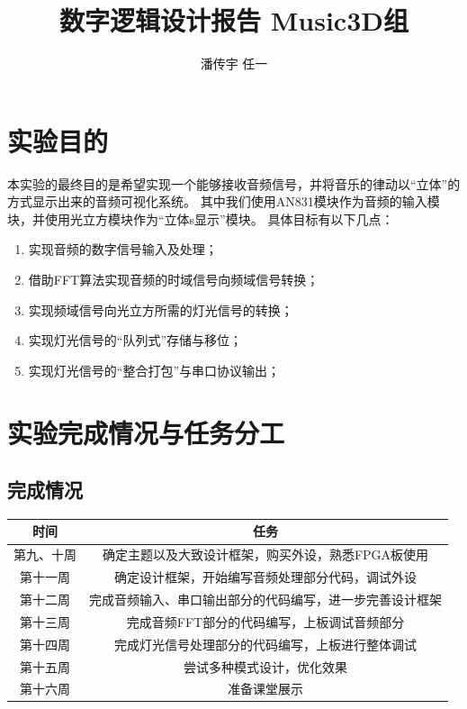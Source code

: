 \documentclass[12pt]{article}
\begin{document}
\title{数字逻辑设计报告 \quad Music3D组}
\author{潘传宇 \quad 任一}
\maketitle

\newpage
\tableofcontents

\newpage
\section{实验目的}
本实验的最终目的是希望实现一个能够接收音频信号，并将音乐的律动以“立体”的方式显示出来的音频可视化系统。
其中我们使用AN831模块作为音频的输入模块，并使用光立方模块作为“立体s显示”模块。
具体目标有以下几点：
\begin{enumerate}
    \item 实现音频的数字信号输入及处理；
    \item 借助FFT算法实现音频的时域信号向频域信号转换；
    \item 实现频域信号向光立方所需的灯光信号的转换；
    \item 实现灯光信号的“队列式”存储与移位；
    \item 实现灯光信号的“整合打包”与串口协议输出；
\end{enumerate}

\section{实验完成情况与任务分工}
\subsection{完成情况}
\begin{center}
    \begin{tabular}{|c|c|}
        \hline
        时间& 任务\\
        \hline
        第九、十周& 确定主题以及大致设计框架，购买外设，熟悉FPGA板使用\\
        \hline
        第十一周& 确定设计框架，开始编写音频处理部分代码，调试外设\\
        \hline
        第十二周& 完成音频输入、串口输出部分的代码编写，进一步完善设计框架\\
        \hline
        第十三周& 完成音频FFT部分的代码编写，上板调试音频部分\\
        \hline
        第十四周& 完成灯光信号处理部分的代码编写，上板进行整体调试\\
        \hline
        第十五周& 尝试多种模式设计，优化效果\\
        \hline
        第十六周& 准备课堂展示\\
        \hline
    \end{tabular}
\end{center}
\end{document}
